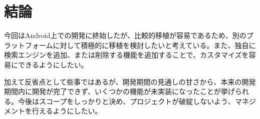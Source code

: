 \chapter{結論}
\label{chap:conclusion}

今回はAndroid上での開発に終始したが、比較的移植が容易であるため、別のプラットフォームに対して積極的に移植を検討したいと考えている。また、独自に検索エンジンを追加、または削除する機能を追加することで、カスタマイズを容易にできるようにしたい。

加えて反省点として些事ではあるが、開発期間の見通しの甘さから、本来の開発期間内に開発が完了できず、いくつかの機能が未実装になったことが挙げられる。今後はスコープをしっかりと決め、プロジェクトが破綻しないよう、マネジメントを行えるようにしたい。